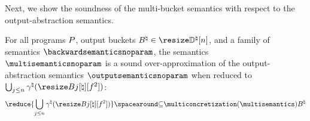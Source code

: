 Next, we show the soundness of the multi-bucket semantics with respect to the output-abstraction semantics.

\begin{lemma}
  For all programs $P$, output buckets $\buckets\in\vectorbuckets$, and a family of semantics $\backwardsemanticsnoparam$, the %
  semantics $\multisemanticsnoparam$ is a \textup{sound over-approximation} of the output-abstraction semantics $\outputsemanticsnoparam$ when reduced to $\bigsetjoin_{j\le n}\abstractdomainconcretization(\bucket)$:
  \[\reduce{\bigsetjoin\limits_{j\le n}\abstractdomainconcretization(\bucket)} \SubseteQ \multiconcretization(\multisemantics)\buckets\]
\end{lemma}

